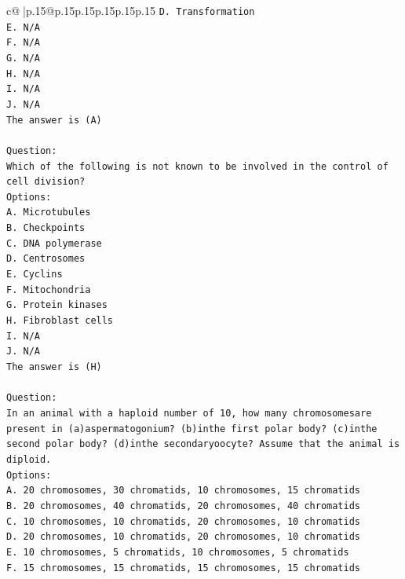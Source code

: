 \documentclass{article}
\begin{document}
{\begin{supertabular}{c@{$\;$}|p{.15\linewidth}@{}p{.15\linewidth}p{.15\linewidth}p{.15\linewidth}p{.15\linewidth}p{.15\linewidth}}
{{{\texttt{D. Transformation} \\
\texttt{E. N/A} \\
\texttt{F. N/A} \\
\texttt{G. N/A} \\
\texttt{H. N/A} \\
\texttt{I. N/A} \\
\texttt{J. N/A} \\
\texttt{The answer is (A)} \\
\\ 
\texttt{Question:} \\
\texttt{Which of the following is not known to be involved in the control of cell division?} \\
\texttt{Options:} \\
\texttt{A. Microtubules} \\
\texttt{B. Checkpoints} \\
\texttt{C. DNA polymerase} \\
\texttt{D. Centrosomes} \\
\texttt{E. Cyclins} \\
\texttt{F. Mitochondria} \\
\texttt{G. Protein kinases} \\
\texttt{H. Fibroblast cells} \\
\texttt{I. N/A} \\
\texttt{J. N/A} \\
\texttt{The answer is (H)} \\
\\ 
\texttt{Question:} \\
\texttt{In an animal with a haploid number of 10, how many chromosomesare present in (a)aspermatogonium? (b)inthe first polar body? (c)inthe second polar body? (d)inthe secondaryoocyte? Assume that the animal is diploid.} \\
\texttt{Options:} \\
\texttt{A. 20 chromosomes, 30 chromatids, 10 chromosomes, 15 chromatids} \\
\texttt{B. 20 chromosomes, 40 chromatids, 20 chromosomes, 40 chromatids} \\
\texttt{C. 10 chromosomes, 10 chromatids, 20 chromosomes, 10 chromatids} \\
\texttt{D. 20 chromosomes, 10 chromatids, 20 chromosomes, 10 chromatids} \\
\texttt{E. 10 chromosomes, 5 chromatids, 10 chromosomes, 5 chromatids} \\
\texttt{F. 15 chromosomes, 15 chromatids, 15 chromosomes, 15 chromatids} \\
}}}
\end{supertabular}}
\end{document}
